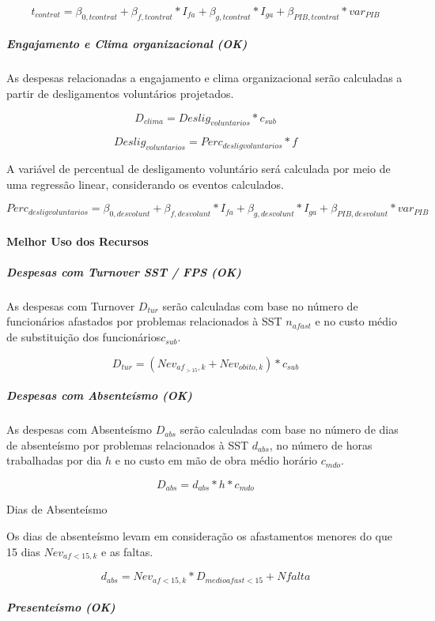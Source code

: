 \documentclass[]{article}
\let\oldparagraph\paragraph
\renewcommand{\paragraph}[1]{\oldparagraph{#1}\mbox{}}
\let\oldsubparagraph\subparagraph
\renewcommand{\subparagraph}[1]{\oldsubparagraph{#1}\mbox{}}
\begin{document}
\[t_{contrat} = \beta_{0,tcontrat} + \beta_{f,tcontrat} * I_{fa} + \beta_{g,tcontrat} * I_{ga} + \beta_{PIB,tcontrat} * var_{PIB}\]

\subparagraph{Engajamento e Clima organizacional
(OK)}\label{engajamento-e-clima-organizacional-ok}

As despesas relacionadas a engajamento e clima organizacional serão
calculadas a partir de desligamentos voluntários projetados.

\[D_{clima} = Deslig_{voluntarios} * c_{sub}\]

\[Deslig_{voluntarios} = Perc_{desligvoluntarios} * f \]

A variável de percentual de desligamento voluntário será calculada por
meio de uma regressão linear, considerando os eventos calculados.

\[Perc_{desligvoluntarios} = \beta_{0,desvolunt} +\beta_{f,desvolunt} * I_{fa} + \beta_{g,desvolunt} * I_{ga} + \beta_{PIB,desvolunt} * var_{PIB}\]

\paragraph{Melhor Uso dos Recursos}\label{melhor-uso-dos-recursos}

\subparagraph{Despesas com Turnover SST / FPS
(OK)}\label{despesas-com-turnover-sst-fps-ok}

As despesas com Turnover \(D_{tur}\) serão calculadas com base no número
de funcionários afastados por problemas relacionados à SST \(n_{afast}\)
e no custo médio de substituição dos funcionários\(c_{sub}\).

\[D_{tur} = (Nev_{af_{>15},k} + Nev_{obito,k}) * c_{sub}\]

\subparagraph{Despesas com Absenteísmo
(OK)}\label{despesas-com-absenteismo-ok}

As despesas com Absenteísmo \(D_{abs}\) serão calculadas com base no
número de dias de absenteísmo por problemas relacionados à SST
\(d_{abs}\), no número de horas trabalhadas por dia \(h\) e no custo em
mão de obra médio horário \(c_{mdo}\).

\[D_{abs} = d_{abs} * h * c_{mdo}\]

Dias de Absenteísmo

Os dias de absenteísmo levam em consideração os afastamentos menores do
que 15 dias \(Nev_{af<15,k}\) e as faltas.

\[ d_{abs} = Nev_{af<15,k} * D_{medioafast<15} + Nfalta\]

\subparagraph{Presenteísmo (OK)}\label{presenteismo-ok}
\end{document}
